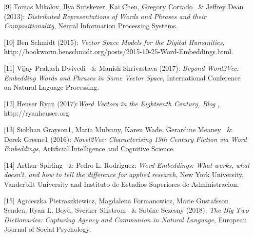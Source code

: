 \documentclass{article}
\begin{document}
[9] Tomas Mikolov, Ilya Sutskever, Kai Chen, Gregory Corrado \ \& Jeffrey Dean (2013): {\it Distributed Representations of Words and Phrases and their Compositionality}, Neural Information Processing Systems.

[10] Ben Schmidt (2015): {\it Vector Space Models for the Digital Humanities}, http://bookworm.benschmidt.org/posts/2015-10-25-Word-Embeddings.html.

[11] Vijay Prakash Dwivedi \ \& Manish Shrivastava (2017): {\it Beyond Word2Vec: Embedding Words and Phrases in Same Vector Space}, International Conference on Natural Laguage Processing.

[12] Heuser Ryan (2017):{\it Word Vectors in the Eighteenth Century, Blog },
http://ryanheuser.org

[13] Siobhan Grayson1, Maria Mulvany, Karen Wade, Gerardine Meaney \ \& Derek Greene1 (2016): {\it Novel2Vec: Characterising 19th Century Fiction
via Word Embeddings}, Artificial Intelligence and Cognitive Science.

[14] Arthur Spirling \ \& Pedro L. Rodriguez: {\it Word Embeddings: What works, what doesn’t, and how to tell the difference for applied research}, New York University, Vanderbilt University and Instituto de Estudios Superiores de Administracion.

[15] Agnieszka Pietraszkiewicz, Magdalena Formanowicz, Marie Gustafsson Senden, Ryan L. Boyd, Sverker Sikstrom \ \& Sabine Sczesny (2018): {\it The Big Two Dictionaries: Capturing Agency and Communion in Natural Language}, European Journal of Social Psychology.
\end{document}
